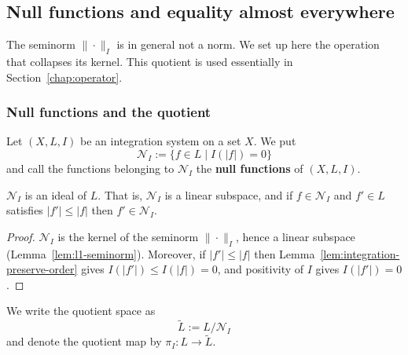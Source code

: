 \subsection{Null functions and equality almost everywhere}\label{sec:ae}

The seminorm $\|\cdot\|_I$ is in general not a norm.
We set up here the operation that collapses its kernel.
This quotient is used essentially in Section~\ref{chap:operator}.

\subsubsection{Null functions and the quotient}

\begin{definition}\label{def:null-function}
  Let $(X,L,I)$ be an integration system on a set $X$. We put
  \[
    \mathcal{N}_I:=\{f\in L\mid I(|f|)=0\}
  \]
  and call the functions belonging to $\mathcal{N}_I$ the \textbf{null functions}
  of $(X,L,I)$.
\end{definition}

\begin{lemma}\label{lem:null-is-ideal}
  $\mathcal{N}_I$ is an ideal of $L$.
  That is, $\mathcal{N}_I$ is a linear subspace, and if $f\in\mathcal{N}_I$ and
  $f'\in L$ satisfies $|f'|\le|f|$ then $f'\in\mathcal{N}_I$.
\end{lemma}
\begin{proof}
  $\mathcal{N}_I$ is the kernel of the seminorm $\|\cdot\|_I$, hence a linear
  subspace (Lemma~\ref{lem:l1-seminorm}).
  Moreover, if $|f'|\le|f|$ then
  Lemma~\ref{lem:integration-preserve-order} gives $I(|f'|)\le I(|f|)=0$, and
  positivity of $I$ gives $I(|f'|)=0$.
\end{proof}

\begin{definition}\label{def:null-quotient}
  We write the quotient space as
  \[
    \widetilde{L}:=L/\mathcal{N}_I
  \]
  and denote the quotient map by $\pi_I:L\to\widetilde{L}$.
\end{definition}

